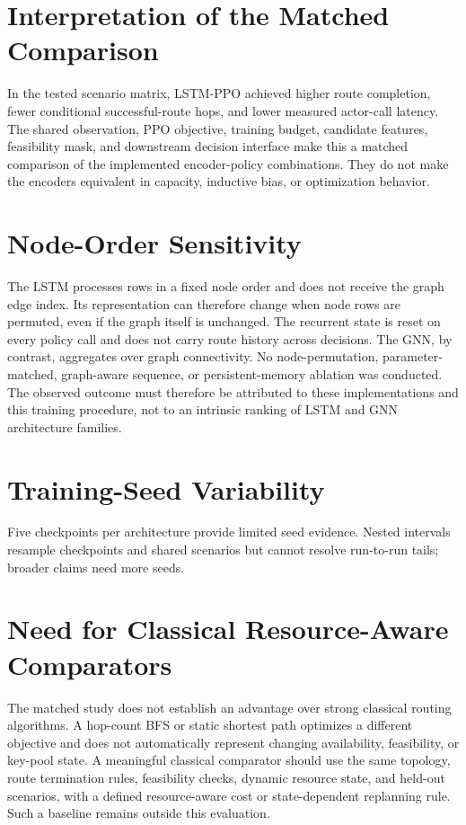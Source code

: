 \documentclass[12pt,a4paper,oneside]{report}
\begin{document}
\section{Interpretation of the Matched Comparison}
In the tested scenario matrix, LSTM-PPO achieved higher route completion, fewer conditional successful-route hops, and lower measured actor-call latency. The shared observation, PPO objective, training budget, candidate features, feasibility mask, and downstream decision interface make this a matched comparison of the implemented encoder-policy combinations. They do not make the encoders equivalent in capacity, inductive bias, or optimization behavior.

\section{Node-Order Sensitivity}
The LSTM processes rows in a fixed node order and does not receive the graph edge index. Its representation can therefore change when node rows are permuted, even if the graph itself is unchanged. The recurrent state is reset on every policy call and does not carry route history across decisions. The GNN, by contrast, aggregates over graph connectivity. No node-permutation, parameter-matched, graph-aware sequence, or persistent-memory ablation was conducted. The observed outcome must therefore be attributed to these implementations and this training procedure, not to an intrinsic ranking of LSTM and GNN architecture families.

\section{Training-Seed Variability}
Five checkpoints per architecture provide limited seed evidence. Nested intervals resample checkpoints and shared scenarios but cannot resolve run-to-run tails; broader claims need more seeds.

\section{Need for Classical Resource-Aware Comparators}
The matched study does not establish an advantage over strong classical routing algorithms. A hop-count BFS or static shortest path optimizes a different objective and does not automatically represent changing availability, feasibility, or key-pool state. A meaningful classical comparator should use the same topology, route termination rules, feasibility checks, dynamic resource state, and held-out scenarios, with a defined resource-aware cost or state-dependent replanning rule. Such a baseline remains outside this evaluation.
\end{document}
